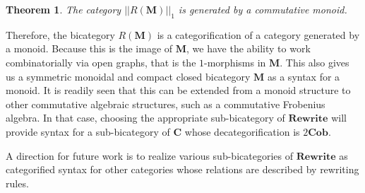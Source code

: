 \documentclass[11pt]{amsart}
\newcommand{\cat}[1]{\mathbf{#1}}
\newtheorem{thm}{Theorem}[section]
\theoremstyle{remark}
\theoremstyle{definition}
\begin{document}
\begin{thm}
	The category $||R(\cat{M})||_1$ is generated by a commutative monoid.
\end{thm}

Therefore, the bicategory $R (\cat{M})$ is a categorification of a category generated by a monoid.  Because this is the image of $\cat{M}$, we have the ability to work combinatorially via open graphs, that is the $1$-morphisms in $\cat{M}$.  This also gives us a symmetric monoidal and compact closed bicategory $\cat{M}$ as a syntax for a monoid.  It is readily seen that this can be extended from a monoid structure to other commutative algebraic structures, such as a commutative Frobenius algebra. In that case, choosing the appropriate sub-bicategory of $\cat{Rewrite}$ will provide syntax for a sub-bicategory of $\cat{C}$ whose decategorification is $2\cat{Cob}$. 

A direction for future work is to realize various sub-bicategories of $\cat{Rewrite}$ as categorified syntax for other categories whose relations are described by rewriting rules.



%
%
\end{document}
